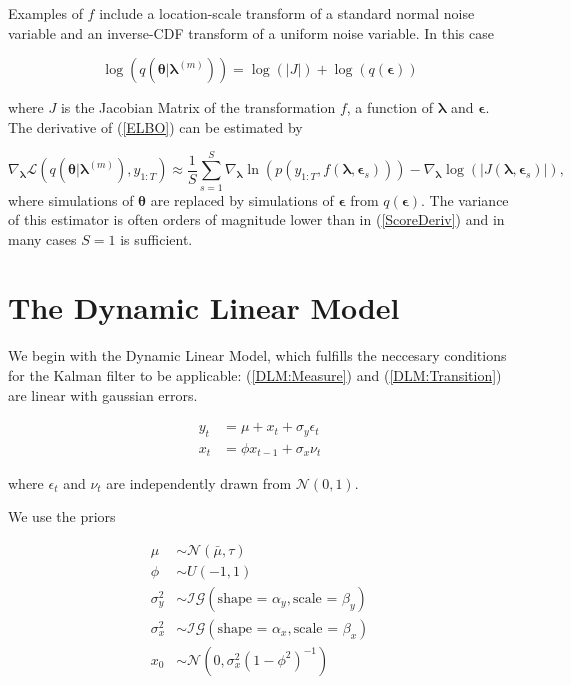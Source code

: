 \documentclass[12pt,a4paper]{article}%
\numberwithin{equation}{section}
\begin{document}
Examples of $f$ include a location-scale transform of a standard normal noise variable and an inverse-CDF transform of a uniform noise variable. In this case

\begin{equation}
\label{ReparamDist}
\log(q(\boldsymbol{\theta} | \boldsymbol{\lambda}^{(m)})) = \log(|J|) + \log(q(\boldsymbol{\epsilon}))
\end{equation}

where $J$ is the Jacobian Matrix of the transformation $f$, a function of $\boldsymbol{\lambda}$ and $\boldsymbol{\epsilon}$. The derivative of (\ref{ELBO}) can be estimated by

\begin{equation}
\label{ReparamDeriv}
\nabla_{\boldsymbol{\lambda}}\mathcal{L}(q(\boldsymbol{\theta} | \boldsymbol{\lambda}^{(m)}), y_{1:T}) \approx \frac{1}{S}\sum_{s=1}^{S} \nabla_{\boldsymbol{\lambda}} \ln (p(y_{1:T}, f(\boldsymbol{\lambda}, \boldsymbol{\epsilon}_s))) - \nabla_{\boldsymbol{\lambda}}\log(|J(\boldsymbol{\lambda}, \boldsymbol{\epsilon}_s)|),
\end{equation}
where simulations of $\boldsymbol{\theta}$ are replaced by simulations of $\boldsymbol{\epsilon}$ from $q(\boldsymbol{\epsilon})$. The variance of this estimator is often orders of magnitude lower than in (\ref{ScoreDeriv}) and in many cases $S=1$ is sufficient.

\section{The Dynamic Linear Model}

We begin with the Dynamic Linear Model, which fulfills the neccesary conditions for the Kalman filter to be applicable: (\ref{DLM:Measure}) and (\ref{DLM:Transition}) are linear with gaussian errors.

\begin{align}
y_t &= \mu + x_t + \sigma_y \epsilon_t \label{DLM:Measure}\\
x_t &= \phi x_{t-1} + \sigma_x \nu_t \label{DLM:Transition}
\end{align}

where $\epsilon_t$ and $\nu_t$ are independently drawn from $\mathcal{N}(0, 1).$

We use the priors

\begin{align}
\mu &\sim \mathcal{N}(\bar{\mu}, \tau) \\
\phi &\sim U(-1, 1) \\
\sigma^2_y &\sim \mathcal{IG}(\mbox{shape = }\alpha_y, \mbox{scale = }\beta_y) \\
\sigma^2_x &\sim \mathcal{IG}(\mbox{shape = }\alpha_x, \mbox{scale = }\beta_x) \\
x_0 &\sim \mathcal{N}(0, \sigma^2_x(1 - \phi^2)^{-1})
\end{align}
\end{document}
